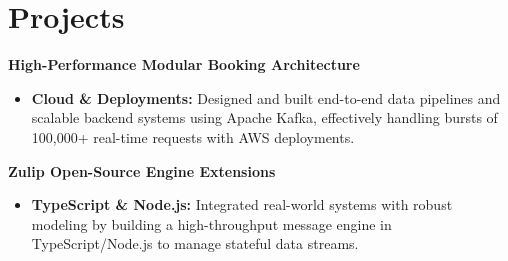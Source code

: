 \documentclass[11pt,a4paper]{article}
\begin{document}
\vspace{-5pt}
\section{Projects}
\noindent
\textbf{High-Performance Modular Booking Architecture}
\begin{itemize}[leftmargin=*,noitemsep,topsep=0pt]
    \item \textbf{Cloud \& Deployments:} Designed and built end-to-end data pipelines and scalable backend systems using Apache Kafka, effectively handling bursts of 100,000+ real-time requests with AWS deployments.
\end{itemize}

\vspace{3pt}
\noindent
\textbf{Zulip Open-Source Engine Extensions}
\begin{itemize}[leftmargin=*,noitemsep,topsep=0pt]
    \item \textbf{TypeScript \& Node.js:} Integrated real-world systems with robust modeling by building a high-throughput message engine in TypeScript/Node.js to manage stateful data streams.
\end{itemize}
\end{document}
